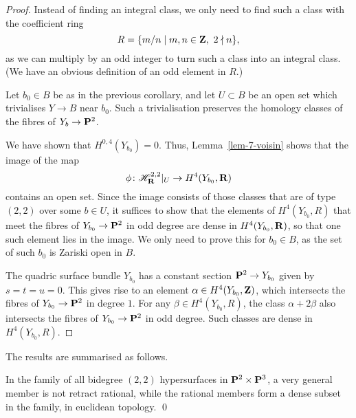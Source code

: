 \begin{proof}
    Instead of finding an integral class, we only need to find such a class with the coefficient ring
    \[ R = \{ m/n \mid m,n \in \bbZ,\ 2 \nmid n \}, \]
    as we can multiply by an odd integer to turn such a class into an integral class.
    (We have an obvious definition of an odd element in $R$.)

    Let $b_0 \in B$ be as in the previous corollary, and let $U \subset B$ be an open set which trivialises $Y \to B$ near $b_0$.
    Such a trivialisation preserves the homology classes of the fibres of $Y_b \to \bbP^2$.

    We have shown that $H^{0,4} (Y_{b_0}) = 0$.
    Thus, Lemma~\ref{lem-7-voisin} shows that the image of the map
    \[ \phi \: \mathscr{H}^{2,2}_{\bbR} |_U \to H^{4} (Y_{b_0}, \bbR) \]
    contains an open set.
    Since the image consists of those classes that are of type $(2,2)$ over some $b \in U$,
    it suffices to show that the elements of $H^4 (Y_{b_0}, R)$ 
    that meet the fibres of $Y_{b_0} \to \bbP^2$ in odd degree are dense in $H^4 (Y_{b_0}, \bbR)$,
    so that one such element lies in the image.
    We only need to prove this for $b_0 \in B$,
    as the set of such $b_0$ is Zariski open in $B$.

    The quadric surface bundle $Y_{b_0}$ has
    a constant section $\bbP^2 \to Y_{b_0}$ given by $s=t=u=0$.
    This gives rise to an element $\alpha \in H^4 (Y_{b_0}, \bbZ)$,
    which intersects the fibres of $Y_{b_0} \to \bbP^2$
    in degree $1$.
    For any $\beta \in H^4 (Y_{b_0}, R)$, the class $\alpha + 2\beta$
    also intersects the fibres of $Y_{b_0} \to \bbP^2$ in odd degree.
    Such classes are dense in $H^4 (Y_{b_0}, R)$.
\end{proof}

The results are summarised as follows.

\begin{theorem}
    In the family of all bidegree $(2,2)$ hypersurfaces in $\bbP^2 \times \bbP^3$,
    a very general member is not retract rational,
    while the rational members form a dense subset in the family, in euclidean topology. \qed
\end{theorem}

